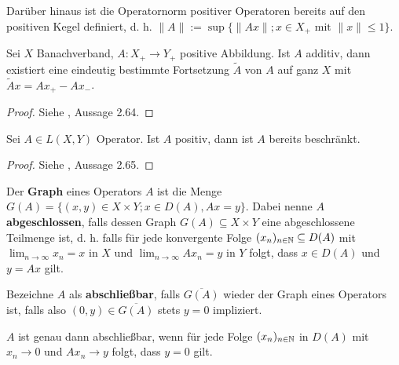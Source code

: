 Darüber hinaus ist die Operatornorm positiver Operatoren bereits auf den positiven Kegel definiert, d. h. $\|A\|:=\sup\big\{\|Ax\|;x\in  X_+ \text{ mit }\|x\|\leq 1\big\}$.




\begin{fsatz}\label{Fortsetzung positiver Operatoren}
Sei $X$ Banachverband,  $A\colon X_+\to Y_+$ positive Abbildung. Ist $A$ additiv, dann 
existiert eine eindeutig bestimmte Fortsetzung $\widetilde{A}$ von $A$ auf ganz $X$ mit $\widetilde{A}x=Ax_+ - Ax_-$. 
\end{fsatz}

\begin{proof}
Siehe \cite{banasiak_arlotti_2006}, Aussage 2.64.
\end{proof}

\begin{fsatz}
Sei $A\in L(X, Y)$ Operator. Ist $A$ positiv, dann ist $A$ bereits beschränkt.
\end{fsatz}

\begin{proof}
Siehe \cite{banasiak_arlotti_2006}, Aussage 2.65.
\end{proof}

\par
Der \textbf{Graph} eines Operators $A$ ist die Menge $G(A)=\{(x,y)\in X\times Y; x\in D(A), Ax= y\}$.  Dabei nenne $A$ \textbf{abgeschlossen}, falls dessen Graph $G(A)\subseteq X\times Y$ eine abgeschlossene Teilmenge ist, d. h. falls für jede konvergente Folge $(x_n)_{n\in\mathbb{N}}\subseteq D(A)$ mit $\lim_{n\to\infty} x_n = x$ in $X$ und $\lim_{n\to\infty} Ax_n = y$ in $Y$ folgt, dass  $x\in D(A)$ und $y= Ax$ gilt. 

Bezeichne $A$ als \label{Operator!abschließbar}\textbf{abschließbar}, falls $\overline{G(A)}$ wieder der Graph eines Operators ist, falls also $(0,y)\in\overline{G(A)}$ stets $y=0$ impliziert.

\begin{prop}
$A$ ist genau dann abschließbar, wenn für jede Folge $(x_n)_{n\in\mathbb{N}}$ in $D(A)$ mit $x_n\to 0$ und $Ax_n\to y$ folgt, dass $y=0$ gilt.
\end{prop}

